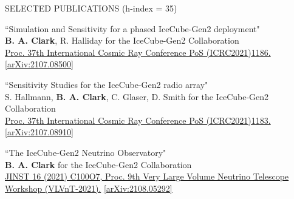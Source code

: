 \documentclass{resume} %
\begin{document}
\begin{rSection}{SELECTED PUBLICATIONS (h-index = 35)}
\begin{etaremune}
  \item ``Simulation and Sensitivity for a phased IceCube-Gen2 deployment" \\
 \textbf{B. A. Clark}, R. Halliday for the IceCube-Gen2 Collaboration \\ \href{https://doi.org/10.22323/1.395.1186}{Proc. 37th International Cosmic Ray Conference PoS (ICRC2021)1186.}  \href{https://arxiv.org/abs/2107.08500}{[arXiv:2107.08500]}
 

  \item ``Sensitivity Studies for the IceCube-Gen2 radio array" \\
 S. Hallmann, \textbf{B. A. Clark}, C. Glaser, D. Smith for the IceCube-Gen2 Collaboration \\ \href{https://doi.org/10.22323/1.395.1183}{Proc. 37th International Cosmic Ray Conference PoS (ICRC2021)1183.}  \href{https://arxiv.org/abs/2107.08910}{[arXiv:2107.08910]}


\item ``The IceCube-Gen2 Neutrino Observatory" \\
\textbf{B. A. Clark} for the IceCube-Gen2 Collaboration \\ \href{https://doi.org/10.1088/1748-0221/16/10/C10007}{JINST 16 (2021) C100O7, Proc. 9th Very Large Volume Neutrino Telescope Workshop (VLVnT-2021).}  \href{https://arxiv.org/abs/2108.05292}{[arXiv:2108.05292]}




\end{etaremune}
\end{rSection}
\end{document}
